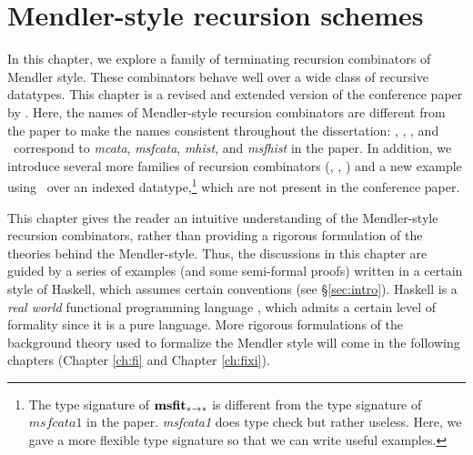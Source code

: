 \chapter{Mendler-style recursion schemes}\label{ch:mendler}
In this chapter, we explore a family of terminating recursion combinators
of Mendler style. These combinators behave well over a wide class of
recursive datatypes. This chapter is a revised and extended version of
the conference paper by \citet{AhnShe11}. Here, the names of Mendler-style
recursion combinators are different from the paper to make the names
consistent throughout the dissertation: \MIt, \MsfIt, \McvIt, and
\MsfcvIt\ correspond to \textit{mcata}, \textit{msfcata}, \textit{mhist},
and \textit{msfhist} in the paper. In addition, we introduce several
more families of recursion combinators (\MPr, \McvIt, \McvPr)
and a new example using \MsfIt\ over an indexed datatype,\footnote{
	The type signature of $\mathbf{msfit}_{* -> *}$ is different
	from the type signature of $\textit{msfcata1}$ in the paper. 
	\textit{msfcata1} does type check but rather useless.
	Here, we gave a more flexible type signature
	so that we can write useful examples.}
which are not present in the conference paper.

This chapter gives the reader an intuitive understanding of the Mendler-style
recursion combinators, rather than providing a rigorous formulation of
the theories behind the Mendler-style. Thus, the discussions in this chapter
are guided by a series of examples (and some semi-formal proofs) written
in a certain style of Haskell, which assumes certain conventions
(see \S\ref{sec:intro}).  Haskell is a \emph{real world}
functional programming language \cite{OSullivan08}, which admits
a certain level of formality since it is a pure language.
More rigorous formulations of the background theory used to formalize
the Mendler style will come in the following chapters
(Chapter \ref{ch:fi} and Chapter \ref{ch:fixi}).





